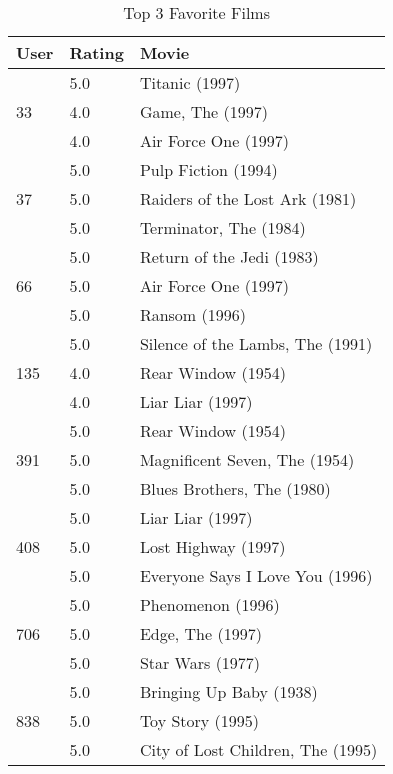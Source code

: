 \begin{table}[h!]
\centering
\begin{tabular}{| l | l | l |}
\hline
User & Rating & Movie \\
\hline\multirow{3}{*}{33} & 5.0 & Titanic (1997) \\
& 4.0 & Game, The (1997)\\ 
& 4.0 & Air Force One (1997)\\
\hline\multirow{3}{*}{37} & 5.0 & Pulp Fiction (1994) \\
& 5.0 & Raiders of the Lost Ark (1981)\\
& 5.0 & Terminator, The (1984)\\ 
\hline\multirow{3}{*}{66} & 5.0 & Return of the Jedi (1983) \\
 & 5.0 & Air Force One (1997)\\
 & 5.0 & Ransom (1996)\\ 
\hline\multirow{3}{*}{135} & 5.0 & Silence of the Lambs, The (1991) \\
& 4.0 & Rear Window (1954)\\ 
& 4.0 & Liar Liar (1997)\\
\hline\multirow{3}{*}{391} & 5.0 & Rear Window (1954) \\
& 5.0 & Magnificent Seven, The (1954)\\ 
& 5.0 & Blues Brothers, The (1980)\\ 
\hline\multirow{3}{*}{408} 
 &  5.0 & Liar Liar (1997)               \\
&  5.0 & Lost Highway (1997)            \\
&  5.0 & Everyone Says I Love You (1996)\\  
\hline\multirow{3}{*}{706} & 5.0 & Phenomenon (1996)            \\
&  5.0 & Edge, The (1997)                \\
&  5.0 & Star Wars (1977)                \\ 
\hline\multirow{3}{*}{838} & 5.0 & Bringing Up Baby (1938)      \\
& 5.0 & Toy Story (1995)                 \\
& 5.0 & City of Lost Children, The (1995)\\
\hline
\end{tabular}
\caption{Top 3 Favorite Films}
\label{tab:topfavorite}
\end{table}

\clearpage
